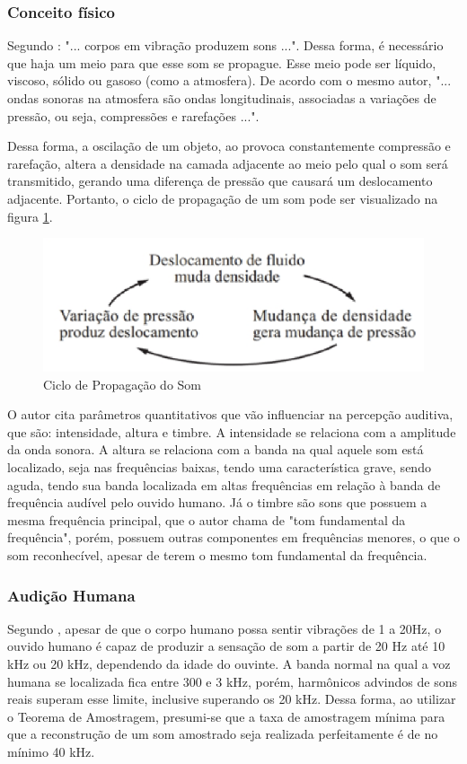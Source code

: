 \subsubsection{Conceito físico}
Segundo \cite{moyses}: "... corpos em vibração produzem sons ...". Dessa forma, é necessário que haja um meio para que esse som se propague. Esse meio pode ser líquido, viscoso, sólido ou gasoso (como a atmosfera). De acordo com o mesmo autor, "... ondas sonoras na atmosfera são ondas longitudinais, associadas a variações de pressão, ou seja, compressões e rarefações ...". \par Dessa forma, a oscilação de um objeto, ao provoca constantemente compressão e rarefação, altera a densidade na camada adjacente ao meio pelo qual o som será transmitido, gerando uma diferença de pressão que causará um deslocamento adjacente. Portanto, o ciclo de propagação de um som pode ser visualizado na figura \ref{fig07}.

\begin{figure}[h]
	\centering
    \includegraphics[scale=0.7]{figuras/fig07.eps}
	\caption{Ciclo de Propagação do Som}
	\label{fig07}
\end{figure}

O autor \cite{moyses} cita parâmetros quantitativos que vão influenciar na percepção auditiva, que são: intensidade, altura e timbre. A intensidade se relaciona com a amplitude da onda sonora. A altura se relaciona com a banda na qual aquele som está localizado, seja nas frequências baixas, tendo uma característica grave, sendo aguda, tendo sua banda localizada em altas frequências em relação à banda de frequência audível pelo ouvido humano. Já o timbre são sons que possuem a mesma frequência principal, que o autor chama de "tom fundamental da frequência", porém, possuem outras componentes em frequências menores, o que o som reconhecível, apesar de terem o mesmo tom fundamental da frequência.

\subsubsection{Audição Humana}
Segundo \cite{farnell}, apesar de que o corpo humano possa sentir vibrações de 1 a 20Hz, o ouvido humano é capaz de produzir a sensação de som a partir de 20 Hz até 10 kHz ou 20 kHz, dependendo da idade do ouvinte. A banda normal na qual a voz humana se localizada fica entre 300 e 3 kHz, porém, harmônicos advindos de sons reais superam esse limite, inclusive superando os 20 kHz.
Dessa forma, ao utilizar o Teorema de Amostragem, presumi-se que a taxa de amostragem mínima para que a reconstrução de um som amostrado seja realizada perfeitamente é de no mínimo 40 kHz. 



